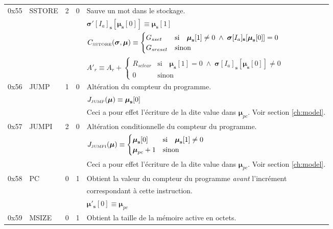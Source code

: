 \documentclass[9pt,oneside]{amsart}
\begin{document}
\begin{tabular*}{\columnwidth}[h]{rlrrl}
\midrule
0x55 & {\small SSTORE} & 2 & 0 & Sauve un mot dans le stockage. \\
&&&& $\boldsymbol{\sigma}'[I_a]_\mathbf{s}[ \boldsymbol{\mu}_\mathbf{s}[0] ] \equiv \boldsymbol{\mu}_\mathbf{s}[1] $ \\
&&&& $C_{\text{\tiny SSTORE}}(\boldsymbol{\sigma}, \boldsymbol{\mu}) \equiv \begin{cases}
G_{sset} & \text{si} \quad \boldsymbol{\mu}_\mathbf{s}[1] \neq 0 \; \wedge \; \boldsymbol{\sigma}[I_a]_\mathbf{s}[\boldsymbol{\mu}_\mathbf{s}[0]] = 0 \\
G_{sreset} & \text{sinon}
\end{cases}$ \\
&&&& $A'_{r} \equiv A_{r} + \begin{cases}
R_{sclear} & \text{si} \quad \boldsymbol{\mu}_\mathbf{s}[1] = 0 \; \wedge \; \boldsymbol{\sigma}[I_a]_\mathbf{s}[\boldsymbol{\mu}_\mathbf{s}[0]] \neq 0 \\
0 & \text{sinon}
\end{cases}$ \\
\midrule
0x56 & {\small JUMP} & 1 & 0 & Altération du compteur du programme. \\
&&&& $J_{\text{\tiny JUMP}}(\boldsymbol{\mu}) \equiv \boldsymbol{\mu}_\mathbf{s}[0] $ \\
&&&& Ceci a pour effet l'écriture de la dite value dans $\boldsymbol{\mu}_{pc}$. Voir section \ref{ch:model}. \\
\midrule
0x57 & {\small JUMPI} & 2 & 0 & Altération conditionnelle du compteur du programme. \\
&&&& $J_{\text{\tiny JUMPI}}(\boldsymbol{\mu}) \equiv \begin{cases} \boldsymbol{\mu}_\mathbf{s}[0] & \text{si} \quad \boldsymbol{\mu}_\mathbf{s}[1] \neq 0 \\ \boldsymbol{\mu}_{pc} + 1 & \text{sinon} \end{cases} $ \\
&&&& Ceci a pour effet l'écriture de la dite value dans $\boldsymbol{\mu}_{pc}$. Voir section \ref{ch:model}. \\
\midrule
0x58 & {\small PC} & 0 & 1 & Obtient la valeur du compteur du programme \textit{avant} l'incrément \\
&&&&  correspondant à cette instruction. \\
&&&& $\boldsymbol{\mu}'_\mathbf{s}[0] \equiv \boldsymbol{\mu}_{pc}$ \\
\midrule
0x59 & {\small MSIZE} & 0 & 1 & Obtient la taille de la mémoire active en octets. \\

\end{tabular*}
\end{document}
